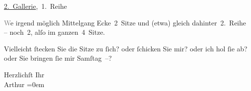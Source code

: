 \pstart
           \uline{2. Gallerie}, 1. Reihe\pend
           
\pstart
           \textcolor{gray}{W}e{\geminationn} irgend möglich Mittelgang
               Ecke 2 Sitze und \introOben{}(etwa)\introOben{} gleich dahinter 2. Reihe – noch 2,
               alſo {\pb}im ganzen 4 Sitze.\pend
           
\pstart
           Vielleicht ſtecken Sie die Sitze zu ſich? oder ſchicken Sie mir? oder ich hol ſie ab?
               oder Sie bringen ſie mir Samſtag –?\pend
           
\pstart
           Herzlichſt Ihr {\\[\baselineskip]}\spacefill\mbox{Arthur}\pend
           \leftskip=0em{}\endnumbering{}  
      